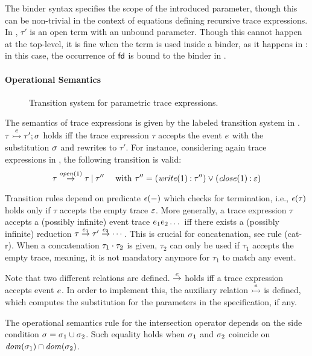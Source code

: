 The binder syntax specifies the scope of the introduced parameter, though this can be non-trivial in the context of equations defining recursive trace expressions.
In , \(\tau'\) is an open term with an unbound parameter.
Though this cannot happen at the top-level, it is fine when the term is used inside a binder, as it happens in : in this case, the occurrence of \(\mathsf{fd}\) is bound to the binder in .

\paragraph{Operational Semantics}
\begin{figure}[t]

\caption{Transition system for parametric trace expressions.}
\label{fig:semantics}
\end{figure}
The semantics of trace expressions is given by the labeled transition system in .
\( \tau \stackrel{{e}}{\rightarrowtail} \tau';\sigma \) holds iff the trace expression \(\tau\) accepts the event \(e\) with the substitution \(\sigma\) and rewrites to \(\tau'\).
For instance, considering again trace expressions in , the following transition is valid:
\[
  \tau \stackrel{{\mathit{open}(1)}}{\rightarrow} \tau\mathbin{|} \tau'' \quad \mbox{ with }
  \tau''= (\mathit{write}(1) \mathbin{:} \tau'') \mathbin{\vee} (\mathit{close}(1) \mathbin{:} \varepsilon)
\]

Transition rules depend on predicate \(\mathit{\epsilon}(-)\) which checks for termination, i.e., \(\mathit{\epsilon}(\tau)\) holds only if \(\tau\) accepts the empty trace \(\varepsilon\).
More generally, a trace expression \(\tau\) accepts a (possibly infinite) event trace \(e_1e_2\dots\) iff there exists a (possibly infinite) reduction \(\tau \stackrel{{e_1}}{\rightarrow} \tau' \stackrel{{e_2}}{\rightarrow} \dotsb\).
This is crucial for concatenation, see rule (cat-r).
When a concatenation \(\tau_1\mathbin{\cdot}\tau_2\) is given, \(\tau_2\) can only be used if \(\tau_1\) accepts the empty trace, meaning, it is not mandatory anymore for \(\tau_1\) to match any event.

Note that two different relations are defined.
\(\stackrel{{e}}{\rightarrow}\) holds iff a trace expression accepts event \(e\).
In order to implement this, the auxiliary relation \(\stackrel{{e}}{\rightarrowtail}\) is defined, which computes the substitution for the parameters in the specification, if any.

The operational semantics rule for the intersection operator depends on the side condition \(\sigma=\sigma_1\cup\sigma_2\).
Such equality holds when \(\sigma_1\) and \(\sigma_2\) coincide on \(\mathit{dom}(\sigma_1) \cap \mathit{dom}(\sigma_2)\).

